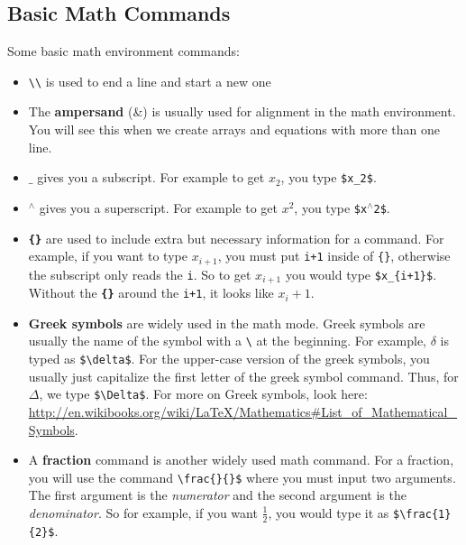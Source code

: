 \documentclass[]{article}%
\newcommand{\bs}{\textbackslash}
\newcommand{\TT}[1]{\texttt{#1}}
\newcommand{\tpc}{\textperiodcentered}
\theoremstyle{definition}
\begin{document}
	\subsection{Basic Math Commands}
	Some basic math environment commands:
	\begin{itemize}
		\item \TT{\bs\bs} is used to end a line and start a new one
		\item The \textbf{ampersand} (\&) is usually used for alignment in the math environment.
		You will see this when we create arrays and equations with more than one line.
		\item $\_$ gives you a subscript.
		For example to get $x_2$, you type \TT{\$x\_2\$}.
		\item $ ^\wedge $ gives you a superscript.
		For example to get $x^2$, you type \TT{\$x$^\wedge$2\$}.
		\item \textbf{\TT{\{\tpc\}}} are used to include extra but necessary information for a command.
		For example, if you want to type $x_{i+1}$, you must put \TT{i+1} inside of \TT{\{\tpc\}}, otherwise the subscript only reads the \TT{i}.
		So to get $x_{i+1}$ you would type \TT{\$x\_\{i+1\}\$}.
		Without the \textbf{\TT{\{\tpc\}}} around the \TT{i+1}, it looks like $x_i+1$.
		\item \textbf{Greek symbols} are widely used in the math mode.
		Greek symbols are usually the name of the symbol with a \TT{\bs} at the beginning.
		For example, $\delta$ is typed as \TT{\$\bs delta\$}.
		For the upper-case version of the greek symbols, you usually just capitalize the first letter of the greek symbol command.
		Thus, for $\Delta$, we type \TT{\$\bs Delta\$}.
		For more on Greek symbols, look here: \url{http://en.wikibooks.org/wiki/LaTeX/Mathematics#List_of_Mathematical_Symbols}.
		\item A \textbf{fraction} command is another widely used math command.
		For a fraction, you will use the command \TT{\bs frac\{\}\{\}\$} where you must input two arguments.
		The first argument is the \emph{numerator} and the second argument is the \emph{denominator}.
		So for example, if you want $\frac{1}{2}$, you would type it as \TT{\$\bs frac\{1\}\{2\}\$}.
	\end{itemize}
\end{document}
